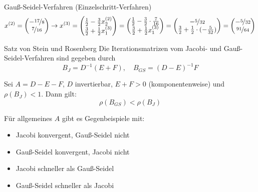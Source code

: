 \begin{example}{Gauß-Seidel-Verfahren (Einzelschritt-Verfahren)}
\[        x^{(2)} = \begin{pmatrix}
            -\nicefrac{17}{8} \\
            \nicefrac{7}{16}
        \end{pmatrix}
        \to
        x^{(3)} = \begin{pmatrix}
            \frac{1}{2} - \frac{3}{2}x_2^{(2)} \\
            \frac{3}{2} + \frac{1}{2}x_1^{(3)}
        \end{pmatrix}
        = \begin{pmatrix}
            \frac{1}{2} - \frac{3}{2} \cdot \frac{7}{16} \\
            \frac{3}{2} + \frac{1}{2}x_1^{(3)}
        \end{pmatrix}
        = \begin{pmatrix}
            -\nicefrac{5}{32} \\
            \frac{3}{2} + \frac{1}{2} \cdot (-\frac{5}{32})
        \end{pmatrix}
        = \begin{pmatrix}
            -\nicefrac{5}{32} \\
            \nicefrac{91}{64}
        \end{pmatrix}
    \]
\end{example}

\begin{defi}{Satz von Stein und Rosenberg}
    Die Iterationsmatrizen vom Jacobi- und Gauß-Seidel-Verfahren sind gegeben durch
    \[
        B_{J} = D^{-1} (E + F), \quad B_{GS} = (D - E)^{-1} F
    \]

    Sei $A = D - E - F$, $D$ invertierbar, $E + F > 0$ (komponentenweise) und $\rho(B_{J}) < 1$.
    Dann gilt:
    \[
        \rho(B_{GS}) < \rho(B_{J})
    \]

    Für allgemeines $A$ gibt es Gegenbeispiele mit:
    \begin{itemize}
        \item Jacobi konvergent, Gauß-Seidel nicht
        \item Gauß-Seidel konvergent, Jacobi nicht
        \item Jacobi schneller als Gauß-Seidel
        \item Gauß-Seidel schneller als Jacobi
    \end{itemize}
\end{defi}

